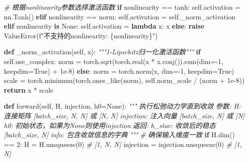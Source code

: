 \documentclass[
  12pt,
]{article}
\newenvironment{Shaded}{}{}
\newcommand{\BuiltInTok}[1]{#1}
\newcommand{\CommentTok}[1]{\textcolor[rgb]{0.38,0.63,0.69}{\textit{#1}}}
\newcommand{\ControlFlowTok}[1]{\textcolor[rgb]{0.00,0.44,0.13}{\textbf{#1}}}
\newcommand{\DecValTok}[1]{\textcolor[rgb]{0.25,0.63,0.44}{#1}}
\newcommand{\FloatTok}[1]{\textcolor[rgb]{0.25,0.63,0.44}{#1}}
\newcommand{\KeywordTok}[1]{\textcolor[rgb]{0.00,0.44,0.13}{\textbf{#1}}}
\newcommand{\NormalTok}[1]{#1}
\newcommand{\OperatorTok}[1]{\textcolor[rgb]{0.40,0.40,0.40}{#1}}
\newcommand{\PreprocessorTok}[1]{\textcolor[rgb]{0.74,0.48,0.00}{#1}}
\newcommand{\SpecialCharTok}[1]{\textcolor[rgb]{0.25,0.44,0.63}{#1}}
\newcommand{\SpecialStringTok}[1]{\textcolor[rgb]{0.73,0.40,0.53}{#1}}
\newcommand{\StringTok}[1]{\textcolor[rgb]{0.25,0.44,0.63}{#1}}
\newcommand{\VariableTok}[1]{\textcolor[rgb]{0.10,0.09,0.49}{#1}}
\begin{document}
\begin{Shaded}
\begin{Highlighting}[]
        \CommentTok{\# 根据nonlinearity参数选择激活函数}
        \ControlFlowTok{if}\NormalTok{ nonlinearity }\OperatorTok{==} \StringTok{\textquotesingle{}tanh\textquotesingle{}}\NormalTok{:}
            \VariableTok{self}\NormalTok{.activation }\OperatorTok{=}\NormalTok{ nn.Tanh()}
        \ControlFlowTok{elif}\NormalTok{ nonlinearity }\OperatorTok{==} \StringTok{\textquotesingle{}norm\textquotesingle{}}\NormalTok{:}
            \VariableTok{self}\NormalTok{.activation }\OperatorTok{=} \VariableTok{self}\NormalTok{.\_norm\_activation}
        \ControlFlowTok{elif}\NormalTok{ nonlinearity }\KeywordTok{is} \VariableTok{None}\NormalTok{:}
            \VariableTok{self}\NormalTok{.activation }\OperatorTok{=} \KeywordTok{lambda}\NormalTok{ x: x}
        \ControlFlowTok{else}\NormalTok{:}
            \ControlFlowTok{raise} \PreprocessorTok{ValueError}\NormalTok{(}\SpecialStringTok{f"不支持的nonlinearity: }\SpecialCharTok{\{}\NormalTok{nonlinearity}\SpecialCharTok{\}}\SpecialStringTok{"}\NormalTok{)}
    
    \KeywordTok{def}\NormalTok{ \_norm\_activation(}\VariableTok{self}\NormalTok{, x):}
        \CommentTok{"""1{-}Lipschitz归一化激活函数"""}
        \ControlFlowTok{if} \VariableTok{self}\NormalTok{.use\_complex:}
\NormalTok{            norm }\OperatorTok{=}\NormalTok{ torch.sqrt(torch.real(x }\OperatorTok{*}\NormalTok{ x.conj()).}\BuiltInTok{sum}\NormalTok{(dim}\OperatorTok{={-}}\DecValTok{1}\NormalTok{, keepdim}\OperatorTok{=}\VariableTok{True}\NormalTok{) }\OperatorTok{+} \FloatTok{1e{-}8}\NormalTok{)}
        \ControlFlowTok{else}\NormalTok{:}
\NormalTok{            norm }\OperatorTok{=}\NormalTok{ torch.norm(x, dim}\OperatorTok{={-}}\DecValTok{1}\NormalTok{, keepdim}\OperatorTok{=}\VariableTok{True}\NormalTok{)}
\NormalTok{        scale }\OperatorTok{=}\NormalTok{ torch.minimum(torch.ones\_like(norm), }
                             \VariableTok{self}\NormalTok{.norm\_scale }\OperatorTok{/}\NormalTok{ (norm }\OperatorTok{+} \FloatTok{1e{-}8}\NormalTok{))}
        \ControlFlowTok{return}\NormalTok{ x }\OperatorTok{*}\NormalTok{ scale}
    
    \KeywordTok{def}\NormalTok{ forward(}\VariableTok{self}\NormalTok{, H, injection, h0}\OperatorTok{=}\VariableTok{None}\NormalTok{):}
        \CommentTok{"""}
\CommentTok{        执行松弛动力学直到收敛}
\CommentTok{        }
\CommentTok{        参数:}
\CommentTok{            H: 连接矩阵 [batch\_size, N, N] 或 [N, N]}
\CommentTok{            injection: 注入向量 [batch\_size, N] 或 [N]}
\CommentTok{            h0: 初始状态，如果为None则使用injection}
\CommentTok{            }
\CommentTok{        返回:}
\CommentTok{            h\_star: 收敛后的稳态 [batch\_size, N]}
\CommentTok{            info: 包含收敛信息的字典}
\CommentTok{        """}
        \CommentTok{\# 确保输入维度一致}
        \ControlFlowTok{if}\NormalTok{ H.dim() }\OperatorTok{==} \DecValTok{2}\NormalTok{:}
\NormalTok{            H }\OperatorTok{=}\NormalTok{ H.unsqueeze(}\DecValTok{0}\NormalTok{)  }\CommentTok{\# [1, N, N]}
\NormalTok{            injection }\OperatorTok{=}\NormalTok{ injection.unsqueeze(}\DecValTok{0}\NormalTok{)  }\CommentTok{\# [1, N]}
        

\end{Highlighting}
\end{Shaded}
\end{document}
